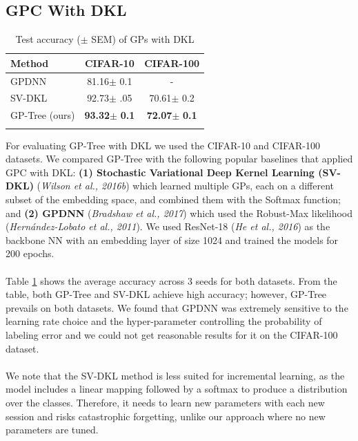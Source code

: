 \documentclass[preprint,11pt]{elsarticle}
\begin{document}
        \subsection{GPC With DKL}
        \label{sec:5.2}
        \begin{table}[ht]
        \centering
        \caption{Test accuracy ($\pm$ SEM) of GPs with DKL}
        \label{tab:table2}
        \begin{tabular}{lcc}
        \Xhline{2\arrayrulewidth}
         Method&        CIFAR-10   &    CIFAR-100       \\
         \hline
         GPDNN&     81.16$\pm$ 0.1      &-          \\
         SV-DKL&       92.73$\pm$ .05    &        70.61$\pm$ 0.2   \\
         \hline
         GP-Tree (ours)& \textbf{93.32}$\pm$ \textbf{0.1} & \textbf{72.07}$\pm$ \textbf{0.1}\\
         \Xhline{2\arrayrulewidth}
        \end{tabular}
        \end{table}
        For evaluating GP-Tree with DKL we used the CIFAR-10
        and CIFAR-100 datasets. We compared GP-Tree with the
        following popular baselines that applied GPC with DKL: \textbf{(1)
        Stochastic Variational Deep Kernel Learning (SV-DKL)}
        (\textit{Wilson et al., 2016b}\cite{wilson2016stochastic}) which learned multiple GPs, each on
        a different subset of the embedding space, and combined
        them with the Softmax function; and \textbf{(2) GPDNN} (\textit{Bradshaw
        et al., 2017}\cite{bradshaw2017adversarial}) which used the Robust-Max likelihood
        (\textit{Hernández-Lobato et al., 2011}\cite{hernandez2011robust}). We used ResNet-18 (\textit{He et al., 2016}\cite{he2016deep}) as the backbone NN with an embedding layer
        of size 1024 and trained the models for 200 epochs.
        \\
        \\
        Table \ref{tab:table2} shows the average accuracy across 3 seeds for both
        datasets. From the table, both GP-Tree and SV-DKL achieve
        high accuracy; however, GP-Tree prevails on both datasets.
        We found that GPDNN was extremely sensitive to the learning
        rate choice and the hyper-parameter controlling the probability
        of labeling error and we could not get reasonable
        results for it on the CIFAR-100 dataset.
        \\
        \\
        We note that the SV-DKL method is less suited for incremental
        learning, as the model includes a linear mapping
        followed by a softmax to produce a distribution over the
        classes. Therefore, it needs to learn new parameters with
        each new session and risks catastrophic forgetting, unlike
        our approach where no new parameters are tuned.
\end{document}
